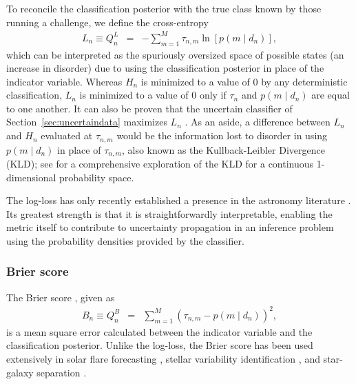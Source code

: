 To reconcile the classification posterior with the true class known by those running a challenge, we define the cross-entropy
\begin{eqnarray}
  \label{eq:logloss}
  L_{n} \equiv Q^{L}_{n} &=& -\sum_{m=1}^{M} \tau_{n, m} \ln[p(m \mid d_{n})],
\end{eqnarray}
which can be interpreted as the spuriously oversized space of possible states (an increase in disorder) due to using the classification posterior in place of the indicator variable.
Whereas $H_{n}$ is minimized to a value of $0$ by any deterministic classification, $L_{n}$ is minimized to a value of $0$ only if $\tau_{n}$ and $p(m \mid d_{n})$ are equal to one another.
It can also be proven that the uncertain classifier of Section~\ref{sec:uncertaindata} maximizes $L_{n}$ \citep{murphy_machine_2012}.
As an aside, a difference between $L_{n}$ and $H_{n}$ evaluated at $\tau_{n, m}$ would be the information lost to disorder in using $p(m \mid d_{n})$ in place of $\tau_{n, m}$, also known as the Kullback-Leibler Divergence (KLD); see \citet{malz_approximating_2018} for a comprehensive exploration of the KLD for a continuous 1-dimensional probability space.

The log-loss has only recently established a presence in the astronomy literature \citep{hon_deep_2017, hon_deep_2018}.
Its greatest strength is that it is straightforwardly interpretable, enabling the metric itself to contribute to uncertainty propagation in an inference problem using the probability densities provided by the classifier.

\subsubsection{Brier score}
\label{sec:brier}

The Brier score \citep{brier_verification_1950}, given as
\begin{eqnarray}
  \label{eq:brier}
  B_{n}  \equiv Q^{B}_{n} &=& \sum_{m=1}^{M} (\tau_{n, m} - p(m \mid d_{n}))^{2},
\end{eqnarray}
is a mean square error calculated between the indicator variable and the classification posterior.
Unlike the log-loss, the Brier score has been used extensively in solar flare forecasting \citep{crown_validation_2012, mays_ensemble_2015, florios_forecasting_2018}, stellar variability identification \citep{richards_construction_2012, armstrong_k2_2016}, and star-galaxy separation \citep{kim_hybrid_2015}.

